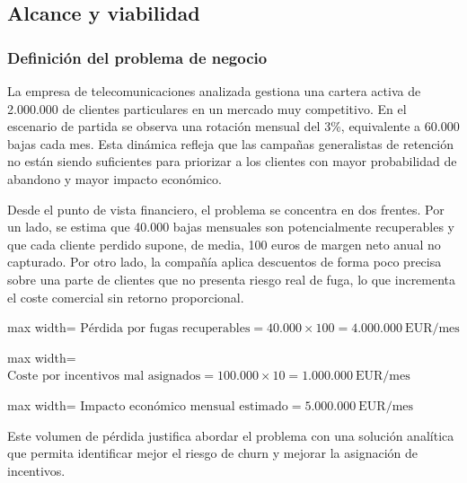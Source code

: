 \documentclass[12pt,a4paper]{article}
\begin{document}
\subsection{Alcance y viabilidad}

\subsubsection{Definición del problema de negocio}

La empresa de telecomunicaciones analizada gestiona una cartera activa de 2.000.000 de clientes particulares en un mercado muy competitivo. En el escenario de partida se observa una rotación mensual del 3\%, equivalente a 60.000 bajas cada mes. Esta dinámica refleja que las campañas generalistas de retención no están siendo suficientes para priorizar a los clientes con mayor probabilidad de abandono y mayor impacto económico.\par

Desde el punto de vista financiero, el problema se concentra en dos frentes. Por un lado, se estima que 40.000 bajas mensuales son potencialmente recuperables y que cada cliente perdido supone, de media, 100 euros de margen neto anual no capturado. Por otro lado, la compañía aplica descuentos de forma poco precisa sobre una parte de clientes que no presenta riesgo real de fuga, lo que incrementa el coste comercial sin retorno proporcional.\par

\begin{adjustbox}{max width=\textwidth}
$\displaystyle \text{Pérdida por fugas recuperables} = 40.000 \times 100 = 4.000.000\ \text{EUR/mes}$
\end{adjustbox}

\begin{adjustbox}{max width=\textwidth}
$\displaystyle \text{Coste por incentivos mal asignados} = 100.000 \times 10 = 1.000.000\ \text{EUR/mes}$
\end{adjustbox}

\begin{adjustbox}{max width=\textwidth}
$\displaystyle \text{Impacto económico mensual estimado} = 5.000.000\ \text{EUR/mes}$
\end{adjustbox}

Este volumen de pérdida justifica abordar el problema con una solución analítica que permita identificar mejor el riesgo de churn y mejorar la asignación de incentivos.\par
\end{document}
